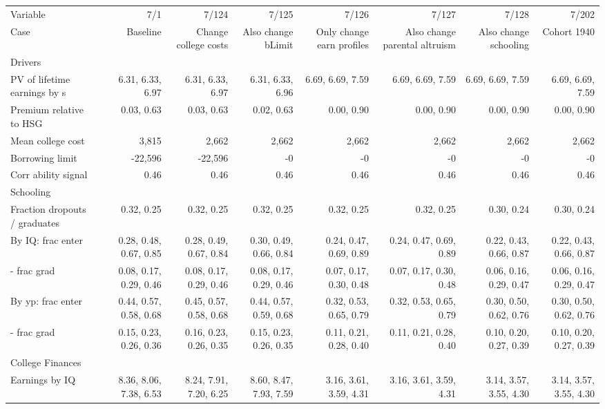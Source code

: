 \begin{tabular}{lrrrrrrr}
\hline
Variable & 7/1  & 7/124  & 7/125  & 7/126  & 7/127  & 7/128  & 7/202  \\
Case & Baseline  & Change college costs  & Also change bLimit  & Only change earn profiles  & Also change parental altruism  & Also change schooling  & Cohort 1940  \\
Drivers &   &   &   &   &   &   &   \\
PV of lifetime earnings by s & 6.31, 6.33, 6.97  & 6.31, 6.33, 6.97  & 6.31, 6.33, 6.96  & 6.69, 6.69, 7.59  & 6.69, 6.69, 7.59  & 6.69, 6.69, 7.59  & 6.69, 6.69, 7.59  \\
Premium relative to HSG & 0.03, 0.63  & 0.03, 0.63  & 0.02, 0.63  & 0.00, 0.90  & 0.00, 0.90  & 0.00, 0.90  & 0.00, 0.90  \\
Mean college cost & 3,815  & 2,662  & 2,662  & 2,662  & 2,662  & 2,662  & 2,662  \\
Borrowing limit & -22,596  & -22,596  & -0  & -0  & -0  & -0  & -0  \\
Corr ability signal & 0.46  & 0.46  & 0.46  & 0.46  & 0.46  & 0.46  & 0.46  \\
\hline
Schooling &   &   &   &   &   &   &   \\
Fraction dropouts / graduates & 0.32, 0.25  & 0.32, 0.25  & 0.32, 0.25  & 0.32, 0.25  & 0.32, 0.25  & 0.30, 0.24  & 0.30, 0.24  \\
By IQ: frac enter & 0.28, 0.48, 0.67, 0.85  & 0.28, 0.49, 0.67, 0.84  & 0.30, 0.49, 0.66, 0.84  & 0.24, 0.47, 0.69, 0.89  & 0.24, 0.47, 0.69, 0.89  & 0.22, 0.43, 0.66, 0.87  & 0.22, 0.43, 0.66, 0.87  \\
- frac grad & 0.08, 0.17, 0.29, 0.46  & 0.08, 0.17, 0.29, 0.46  & 0.08, 0.17, 0.29, 0.46  & 0.07, 0.17, 0.30, 0.48  & 0.07, 0.17, 0.30, 0.48  & 0.06, 0.16, 0.29, 0.47  & 0.06, 0.16, 0.29, 0.47  \\
By yp: frac enter & 0.44, 0.57, 0.58, 0.68  & 0.45, 0.57, 0.58, 0.68  & 0.44, 0.57, 0.59, 0.68  & 0.32, 0.53, 0.65, 0.79  & 0.32, 0.53, 0.65, 0.79  & 0.30, 0.50, 0.62, 0.76  & 0.30, 0.50, 0.62, 0.76  \\
- frac grad & 0.15, 0.23, 0.26, 0.36  & 0.16, 0.23, 0.26, 0.35  & 0.15, 0.23, 0.26, 0.35  & 0.11, 0.21, 0.28, 0.40  & 0.11, 0.21, 0.28, 0.40  & 0.10, 0.20, 0.27, 0.39  & 0.10, 0.20, 0.27, 0.39  \\
\hline
College Finances &   &   &   &   &   &   &   \\
Earnings by IQ & 8.36, 8.06, 7.38, 6.53  & 8.24, 7.91, 7.20, 6.25  & 8.60, 8.47, 7.93, 7.59  & 3.16, 3.61, 3.59, 4.31  & 3.16, 3.61, 3.59, 4.31  & 3.14, 3.57, 3.55, 4.30  & 3.14, 3.57, 3.55, 4.30  \\

\end{tabular}
